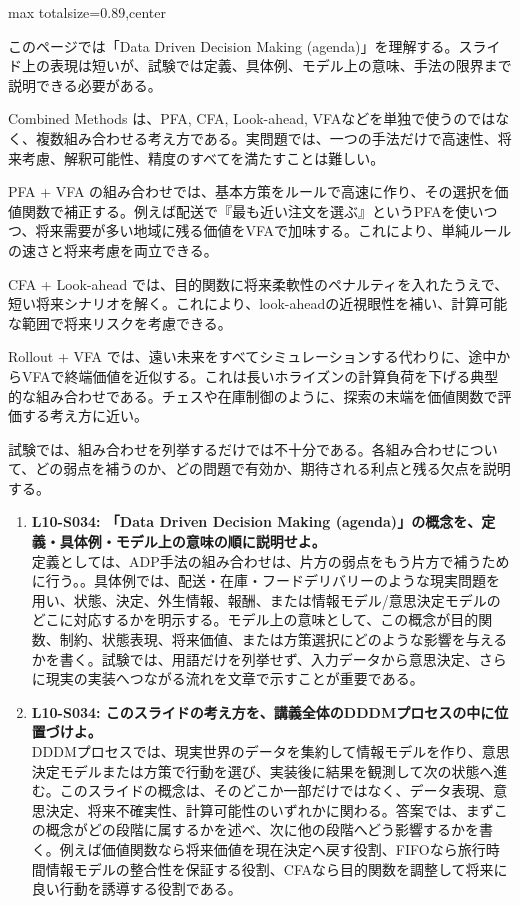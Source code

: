 \begin{minipage}[t]{0.58\textwidth}
\begin{adjustbox}{max totalsize={\textwidth}{0.89\textheight},center}
\begin{minipage}{\textwidth}\scriptsize
{}このページでは「Data Driven Decision Making (agenda)」を理解する。スライド上の表現は短いが、試験では定義、具体例、モデル上の意味、手法の限界まで説明できる必要がある。\par
Combined Methods は、PFA, CFA, Look-ahead, VFAなどを単独で使うのではなく、複数組み合わせる考え方である。実問題では、一つの手法だけで高速性、将来考慮、解釈可能性、精度のすべてを満たすことは難しい。\par
PFA + VFA の組み合わせでは、基本方策をルールで高速に作り、その選択を価値関数で補正する。例えば配送で『最も近い注文を選ぶ』というPFAを使いつつ、将来需要が多い地域に残る価値をVFAで加味する。これにより、単純ルールの速さと将来考慮を両立できる。\par
CFA + Look-ahead では、目的関数に将来柔軟性のペナルティを入れたうえで、短い将来シナリオを解く。これにより、look-aheadの近視眼性を補い、計算可能な範囲で将来リスクを考慮できる。\par
Rollout + VFA では、遠い未来をすべてシミュレーションする代わりに、途中からVFAで終端価値を近似する。これは長いホライズンの計算負荷を下げる典型的な組み合わせである。チェスや在庫制御のように、探索の末端を価値関数で評価する考え方に近い。\par
試験では、組み合わせを列挙するだけでは不十分である。各組み合わせについて、どの弱点を補うのか、どの問題で有効か、期待される利点と残る欠点を説明する。\par{}\begin{enumerate}\item \textbf{L10-S034: 「Data Driven Decision Making (agenda)」の概念を、定義・具体例・モデル上の意味の順に説明せよ。}\\定義としては、ADP手法の組み合わせは、片方の弱点をもう片方で補うために行う。。具体例では、配送・在庫・フードデリバリーのような現実問題を用い、状態、決定、外生情報、報酬、または情報モデル/意思決定モデルのどこに対応するかを明示する。モデル上の意味として、この概念が目的関数、制約、状態表現、将来価値、または方策選択にどのような影響を与えるかを書く。試験では、用語だけを列挙せず、入力データから意思決定、さらに現実の実装へつながる流れを文章で示すことが重要である。\item \textbf{L10-S034: このスライドの考え方を、講義全体のDDDMプロセスの中に位置づけよ。}\\DDDMプロセスでは、現実世界のデータを集約して情報モデルを作り、意思決定モデルまたは方策で行動を選び、実装後に結果を観測して次の状態へ進む。このスライドの概念は、そのどこか一部だけではなく、データ表現、意思決定、将来不確実性、計算可能性のいずれかに関わる。答案では、まずこの概念がどの段階に属するかを述べ、次に他の段階へどう影響するかを書く。例えば価値関数なら将来価値を現在決定へ戻す役割、FIFOなら旅行時間情報モデルの整合性を保証する役割、CFAなら目的関数を調整して将来に良い行動を誘導する役割である。\end{enumerate}
\end{minipage}
\end{adjustbox}
\end{minipage}


